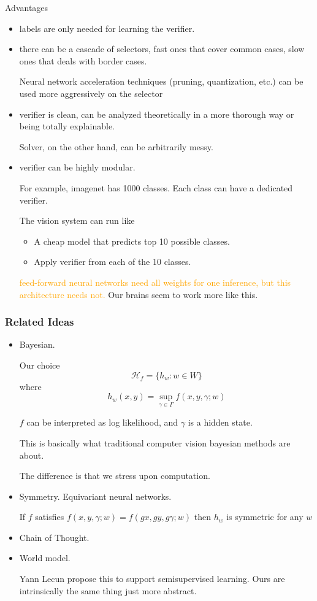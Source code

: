 \documentclass{beamer}   	%
\theoremstyle{definition}
\newcommand{\highlight}[1]{\textcolor{orange}{#1}}
\begin{document}
\begin{frame}
Advantages
\begin{itemize}
	\item labels are only needed for learning the verifier.
	\item there can be a cascade of selectors, fast ones that cover common cases, slow ones that deals with border cases.

	Neural network acceleration techniques (pruning, quantization, etc.) can be used more aggressively on the selector
	\item verifier is clean, can be analyzed theoretically in a more thorough way or being totally explainable.

	Solver, on the other hand, can be arbitrarily messy.
	\item verifier can be highly modular.

	For example, imagenet has 1000 classes. Each class can have a dedicated verifier.

	The vision system can run like
	\begin{itemize}
		\item A cheap model that predicts top 10 possible classes.
		\item Apply verifier from each of the 10 classes.
	\end{itemize}

\highlight{feed-forward neural networks need all weights for one inference, but this architecture needs not.} Our brains seem to work more like this.
\end{itemize}
\end{frame}

\begin{frame}
\frametitle{Related Ideas}
\begin{itemize}
	\item Bayesian.

	Our choice
	\begin{equation}
		\mathcal{H}_f=\{h_w: w\in W\}
	\end{equation}
	where
	\begin{equation}
		h_w(x,y)=\sup_{\gamma\in \Gamma} f(x,y,\gamma;w)
	\end{equation}

	$f$ can be interpreted as log likelihood, and $\gamma$ is a hidden state.

	This is basically what traditional computer vision bayesian methods are about.

	The difference is that we stress upon computation.
	\item Symmetry. Equivariant neural networks.

	If $f$ satisfies $f(x,y,\gamma;w)=f(gx,gy,g\gamma;w)$ then $h_w$ is symmetric for any $w$
	\item Chain of Thought.
	\item World model.

	Yann Lecun propose this to support semisupervised learning. Ours are intrinsically the same thing just more abstract.
\end{itemize}
\end{frame}
\end{document}

